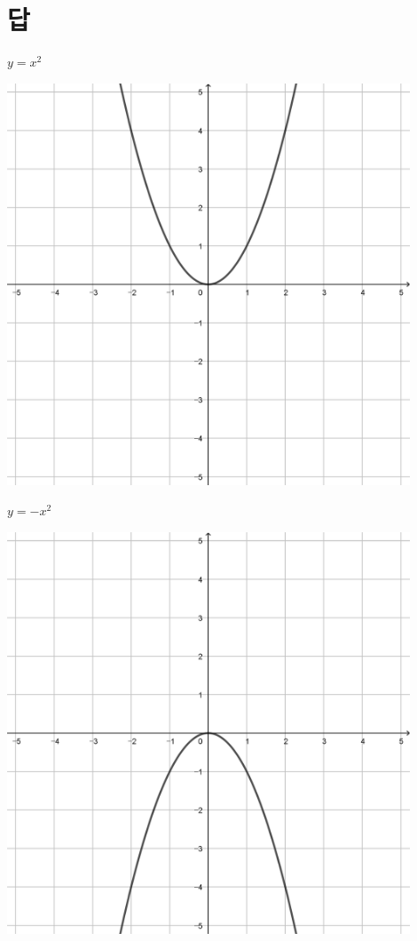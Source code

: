 \documentclass[a4paper]{oblivoir}
\let\oldsection\section
\renewcommand\section{\clearpage\oldsection}
\begin{document}
\section*{답}

\begin{minipage}{0.45\textwidth}\centering
\(y=x^2\)
\par\bigskip\includegraphics[width=0.9\textwidth]{img/2_quadratic_1}
\end{minipage}
\begin{minipage}{0.45\textwidth}\centering
\(y=-x^2\)
\par\bigskip\includegraphics[width=0.9\textwidth]{img/2_quadratic_2}
\end{minipage}\bigskip\bigskip\par
\end{document}
